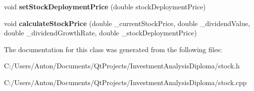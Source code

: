 \begin{DoxyCompactItemize}
\item 
\hypertarget{class_stock_ab1dce2dcc0250ae0ffd8d9ce7d9a9a8c}{}void {\bfseries set\+Stock\+Deployment\+Price} (double stock\+Deployment\+Price)\label{class_stock_ab1dce2dcc0250ae0ffd8d9ce7d9a9a8c}

\item 
\hypertarget{class_stock_a2285d8ead7c70d418d4f324195ad3554}{}void {\bfseries calculate\+Stock\+Price} (double \+\_\+current\+Stock\+Price, double \+\_\+dividend\+Value, double \+\_\+dividend\+Growth\+Rate, double \+\_\+stock\+Deployment\+Price)\label{class_stock_a2285d8ead7c70d418d4f324195ad3554}

\end{DoxyCompactItemize}


The documentation for this class was generated from the following files\+:\begin{DoxyCompactItemize}
\item 
C\+:/\+Users/\+Anton/\+Documents/\+Qt\+Projects/\+Investment\+Analysis\+Diploma/stock.\+h\item 
C\+:/\+Users/\+Anton/\+Documents/\+Qt\+Projects/\+Investment\+Analysis\+Diploma/stock.\+cpp\end{DoxyCompactItemize}
